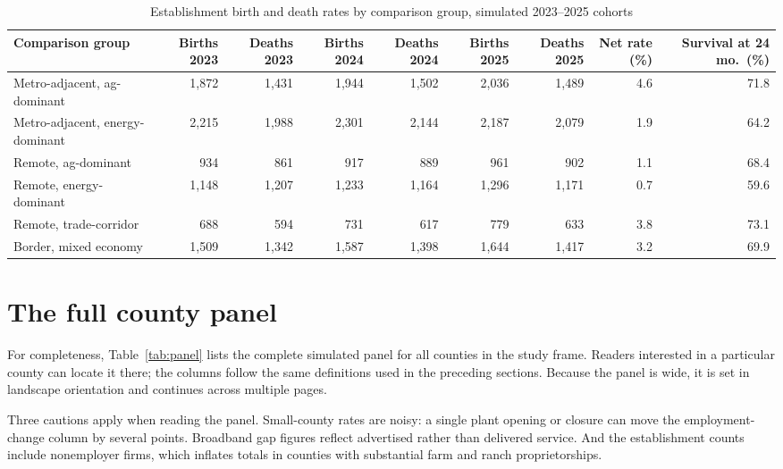 \documentclass[11pt]{article}
\begin{document}
\begin{landscape}
\begin{table}
\centering
\caption{Establishment birth and death rates by comparison group, simulated 2023--2025 cohorts}
\label{tab:formation}
\begin{tabular}{lrrrrrrrr}
\toprule
Comparison group & Births 2023 & Deaths 2023 & Births 2024 & Deaths 2024 & Births 2025 & Deaths 2025 & Net rate (\%) & Survival at 24 mo.\ (\%) \\
\midrule
Metro-adjacent, ag-dominant      & 1,872 & 1,431 & 1,944 & 1,502 & 2,036 & 1,489 &  4.6 & 71.8 \\
Metro-adjacent, energy-dominant  & 2,215 & 1,988 & 2,301 & 2,144 & 2,187 & 2,079 &  1.9 & 64.2 \\
Remote, ag-dominant              &   934 &   861 &   917 &   889 &   961 &   902 &  1.1 & 68.4 \\
Remote, energy-dominant          & 1,148 & 1,207 & 1,233 & 1,164 & 1,296 & 1,171 &  0.7 & 59.6 \\
Remote, trade-corridor           &   688 &   594 &   731 &   617 &   779 &   633 &  3.8 & 73.1 \\
Border, mixed economy            & 1,509 & 1,342 & 1,587 & 1,398 & 1,644 & 1,417 &  3.2 & 69.9 \\
\bottomrule
\end{tabular}
\end{table}
\end{landscape}

\section{The full county panel}

For completeness, Table~\ref{tab:panel} lists the complete simulated panel
for all counties in the study frame. Readers interested in a particular
county can locate it there; the columns follow the same definitions used in
the preceding sections. Because the panel is wide, it is set in landscape
orientation and continues across multiple pages.

Three cautions apply when reading the panel. Small-county rates are noisy:
a single plant opening or closure can move the employment-change column by
several points. Broadband gap figures reflect advertised rather than
delivered service. And the establishment counts include nonemployer firms,
which inflates totals in counties with substantial farm and ranch
proprietorships.
\end{document}
